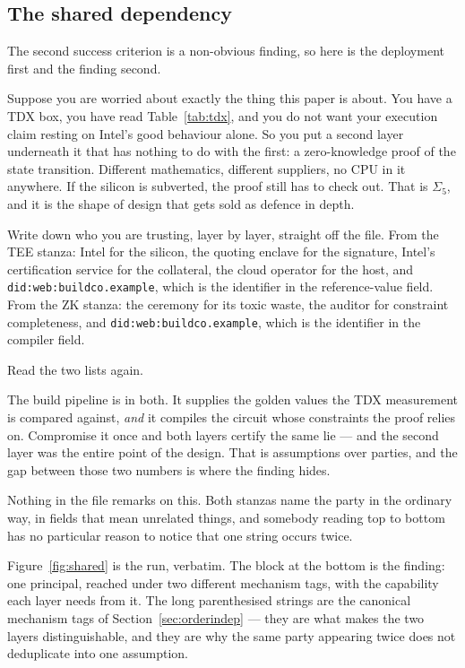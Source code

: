 \documentclass[11pt]{article}
\begin{document}
\subsection{The shared dependency}
\label{sec:shared}

The second success criterion is a non-obvious finding, so here is the
deployment first and the finding second.

Suppose you are worried about exactly the thing this paper is about. You have
a TDX box, you have read Table~\ref{tab:tdx}, and you do not want your
execution claim resting on Intel's good behaviour alone. So you put a second
layer underneath it that has nothing to do with the first: a zero-knowledge
proof of the state transition. Different mathematics, different suppliers,
no CPU in it anywhere. If the silicon is subverted, the proof still has to
check out. That is $\Sigma_5$, and it is the shape of design that gets sold
as defence in depth.

Write down who you are trusting, layer by layer, straight off the file. From
the TEE stanza: Intel for the silicon, the quoting enclave for the signature,
Intel's certification service for the collateral, the cloud operator for the
host, and \texttt{did:web:buildco.example}, which is the identifier in the
reference-value field. From the ZK stanza: the ceremony for its toxic waste,
the auditor for constraint completeness, and
\texttt{did:web:buildco.example}, which is the identifier in the compiler
field.

Read the two lists again.

The build pipeline is in both. It supplies the golden values the TDX
measurement is compared against, \emph{and} it compiles the circuit whose
constraints the proof relies on. Compromise it once and both layers certify
the same lie --- and the second layer was the entire point of the design.
That is \SigmaFiveAssumptions{} assumptions over \SigmaFiveParties{}
parties, and the gap between those two numbers is where the finding hides.

Nothing in the file remarks on this. Both stanzas name the party in the
ordinary way, in fields that mean unrelated things, and somebody reading top
to bottom has no particular reason to notice that one string occurs twice.

Figure~\ref{fig:shared} is the run, verbatim. The block at the bottom is the
finding: one principal, reached under two different mechanism tags, with the
capability each layer needs from it. The long parenthesised strings are the
canonical mechanism tags of Section~\ref{sec:orderindep} --- they are what
makes the two layers distinguishable, and they are why the same party
appearing twice does not deduplicate into one assumption.
\end{document}
